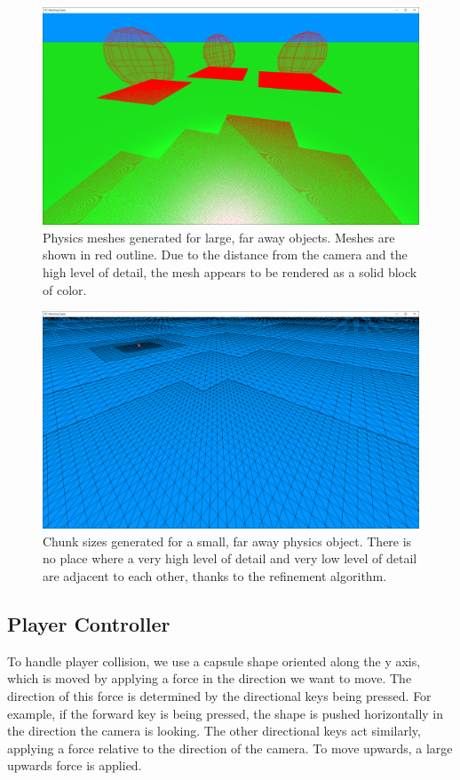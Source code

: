 \documentclass[11pt]{article}
\begin{document}
\begin{figure}[H]
  \includegraphics[width=\textwidth]{meshes2.png}
  \caption{Physics meshes generated for large, far away objects. Meshes are shown in red outline. Due to the distance from the camera and the high level of detail, the mesh appears to be rendered as a solid block of color.}
  \label{fig:meshes2}
\end{figure}

\begin{figure}[H]
  \includegraphics[width=\textwidth]{meshes3.png}
  \caption{Chunk sizes generated for a small, far away physics object. There is no place where a very high level of detail and very low level of detail are adjacent to each other, thanks to the refinement algorithm.}
  \label{fig:meshes3}
\end{figure}

\subsection{Player Controller}
To handle player collision, we use a capsule shape oriented along the y axis, which is moved by applying a force in the direction we want to move. The direction of this force is determined by the directional keys being pressed. For example, if the forward key is being pressed, the shape is pushed horizontally in the direction the camera is looking. The other directional keys act similarly, applying a force relative to the direction of the camera. To move upwards, a large upwards force is applied. 
\end{document}
